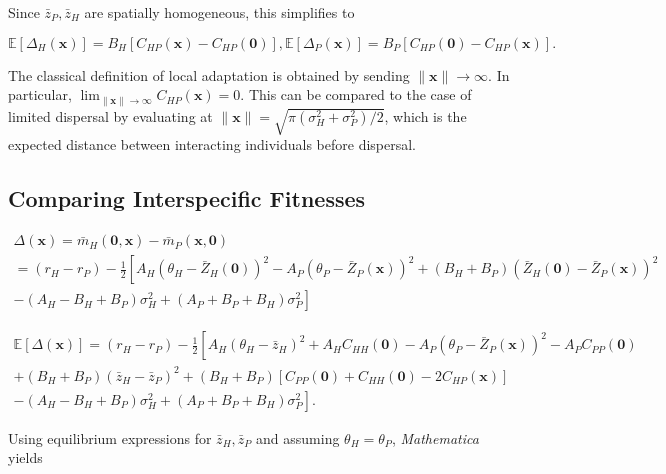 \documentclass{article}
\begin{document}
Since \(\bar z_P,\bar z_H\) are spatially homogeneous, this simplifies
to

\begin{subequations}
  \begin{equation}
    \mathbb E[\Delta_H(\pmb x)] = B_H\left[C_{HP}(\pmb x) - C_{HP}(\pmb 0) \right],
  \end{equation}
  \begin{equation}
    \mathbb E[\Delta_P(\pmb x)] = B_P\left[C_{HP}(\pmb 0) - C_{HP}(\pmb x) \right].
  \end{equation}
\end{subequations}

The classical definition of local adaptation is obtained by sending
\(\|\pmb x\|\to\infty\). In particular,
\(\lim_{\|\pmb x\|\to\infty}C_{HP}(\pmb x)=0\). This can be compared to
the case of limited dispersal by evaluating at
\(\|\pmb x\|=\sqrt{\pi(\sigma_H^2+\sigma_P^2)/2}\), which is the
expected distance between interacting individuals before dispersal.

\hypertarget{comparing-interspecific-fitnesses}{%
\subsection{Comparing Interspecific
Fitnesses}\label{comparing-interspecific-fitnesses}}

\begin{multline}
  \Delta(\pmb x) = \bar m_H(\pmb 0,\pmb x) - \bar m_P(\pmb x,\pmb 0) \\ 
    = (r_H-r_P)-\frac{1}{2}\left[A_H(\theta_H-\bar Z_H(\pmb 0))^2-A_P(\theta_P-\bar Z_P(\pmb x))^2+(B_H+B_P)(\bar Z_H(\pmb 0)-\bar Z_P(\pmb x))^2\right. \\
      -\left.(A_H-B_H+B_P)\sigma_H^2+(A_P+B_P+B_H)\sigma_P^2\right]
\end{multline}

\begin{multline}
  \mathbb E[\Delta(\pmb x)] = (r_H-r_P)-\frac{1}{2}\left[A_H(\theta_H-\bar z_H)^2+A_HC_{HH}(\pmb 0)-A_P(\theta_P-\bar Z_P(\pmb x))^2-A_PC_{PP}(\pmb 0)\right. \\
      \left. +(B_H+B_P)(\bar z_H-\bar z_P)^2+(B_H+B_P)[C_{PP}(\pmb 0) + C_{HH}(\pmb 0) - 2C_{HP}(\pmb x)]\right. \\
        \left. -(A_H-B_H+B_P)\sigma_H^2+(A_P+B_P+B_H)\sigma_P^2\right].
\end{multline}

Using equilibrium expressions for \(\bar z_H,\bar z_P\) and assuming
\(\theta_H=\theta_P\), \emph{Mathematica} yields
\end{document}
